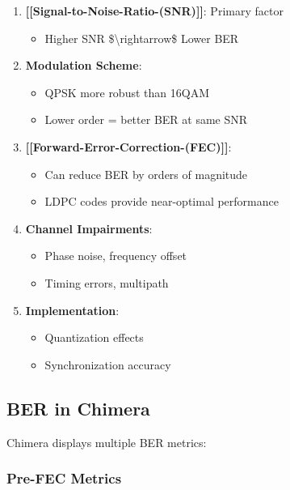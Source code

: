 \begin{enumerate}
\def\labelenumi{\arabic{enumi}.}
\tightlist
\item
  \textbf{{[}{[}Signal-to-Noise-Ratio-(SNR){]}{]}}: Primary factor

  \begin{itemize}
  \tightlist
  \item
    Higher SNR \$\textbackslash rightarrow\$ Lower BER
  \end{itemize}
\item
  \textbf{Modulation Scheme}:

  \begin{itemize}
  \tightlist
  \item
    QPSK more robust than 16QAM
  \item
    Lower order = better BER at same SNR
  \end{itemize}
\item
  \textbf{{[}{[}Forward-Error-Correction-(FEC){]}{]}}:

  \begin{itemize}
  \tightlist
  \item
    Can reduce BER by orders of magnitude
  \item
    LDPC codes provide near-optimal performance
  \end{itemize}
\item
  \textbf{Channel Impairments}:

  \begin{itemize}
  \tightlist
  \item
    Phase noise, frequency offset
  \item
    Timing errors, multipath
  \end{itemize}
\item
  \textbf{Implementation}:

  \begin{itemize}
  \tightlist
  \item
    Quantization effects
  \item
    Synchronization accuracy
  \end{itemize}
\end{enumerate}

\subsection{BER in Chimera}\label{ber-in-chimera}

Chimera displays multiple BER metrics:

\subsubsection{Pre-FEC Metrics}\label{pre-fec-metrics}

